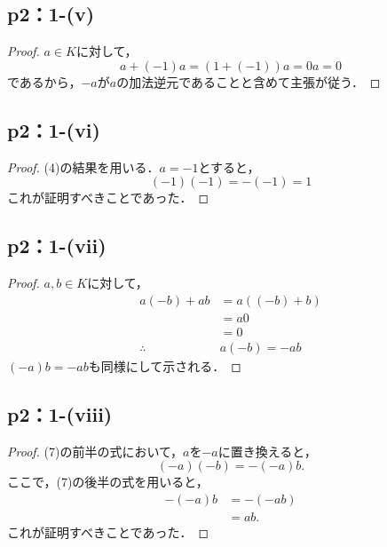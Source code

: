 \documentclass[a4paper,10pt,fleqn]{ltjsarticle}
\begin{document}
\subsection*{p2：1-(v)}
\begin{leftbar}
    \begin{proof}
    $a \in K$に対して，
    \[
        a+(-1)a=(1+(-1))a =0a =0
    \]
    であるから，$-a$が$a$の加法逆元であることと含めて主張が従う．
    \end{proof}
\end{leftbar}

\newpage 

\subsection*{p2：1-(vi)}
\begin{leftbar}
    \begin{proof}
    (4)の結果を用いる．$a=-1$とすると，
    \[
        (-1)(-1)=-(-1)=1
    \]
    これが証明すべきことであった．
    \end{proof}
\end{leftbar}
\subsection*{p2：1-(vii)}

\begin{leftbar}
    \begin{proof}
    $a,b \in K$に対して，
    \begin{align*}
     a(-b)+ab & = a((-b)+b) \\
     & = a0 \\
    & =0 \\
\therefore \quad & a(-b)=-ab 
    \end{align*}
$(-a)b = -ab$も同様にして示される．
\end{proof}
\end{leftbar}

\subsection*{p2：1-(viii)}

\begin{leftbar}
    \begin{proof}
        (7)の前半の式において，$a$を$-a$に置き換えると，
        \[
            (-a)(-b) = -(-a)b.
        \]
        ここで，(7)の後半の式を用いると，
        \begin{align*} 
            -(-a)b & = -(-ab) \\
            & = ab.
        \end{align*}
        これが証明すべきことであった．
        \end{proof}
\end{leftbar}
\end{document}
